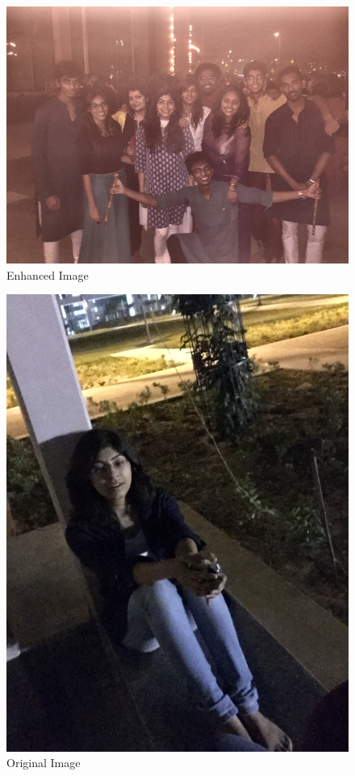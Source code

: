 \begin{figure}[!h]
  \includegraphics[scale=0.07]{party_foggy_dark-Enhanced.jpg}
\caption{Enhanced Image}
\label{fig:3}       
\end{figure}

\begin{figure}[!h]
  \includegraphics[scale=0.20,angle=-90,origin=c]{Mugdha_sitting_original.jpg}
\caption{Original Image}
\label{fig:3}       
\end{figure}

